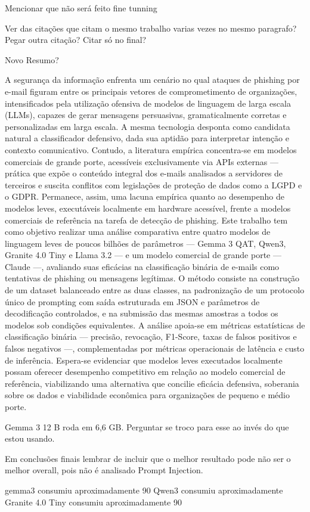 
Mencionar que não será feito fine tunning


Ver das citações que citam o mesmo trabalho varias vezes no mesmo paragrafo?
    Pegar outra citação?
    Citar só no final?


Novo Resumo?

A segurança da informação enfrenta um cenário no qual ataques de phishing por e-mail figuram entre os principais vetores de comprometimento de organizações, intensificados pela utilização ofensiva de modelos de linguagem de larga escala (LLMs), capazes de gerar mensagens persuasivas, gramaticalmente corretas e personalizadas em larga escala. A mesma tecnologia desponta como candidata natural a classificador defensivo, dada sua aptidão para interpretar intenção e contexto comunicativo. Contudo, a literatura empírica concentra-se em modelos comerciais de grande porte, acessíveis exclusivamente via APIs externas — prática que expõe o conteúdo integral dos e-mails analisados a servidores de terceiros e suscita conflitos com legislações de proteção de dados como a LGPD e o GDPR. Permanece, assim, uma lacuna empírica quanto ao desempenho de modelos leves, executáveis localmente em hardware acessível, frente a modelos comerciais de referência na tarefa de detecção de phishing. Este trabalho tem como objetivo realizar uma análise comparativa entre quatro modelos de linguagem leves de poucos bilhões de parâmetros — Gemma 3 QAT, Qwen3, Granite 4.0 Tiny e Llama 3.2 — e um modelo comercial de grande porte — Claude —, avaliando suas eficácias na classificação binária de e-mails como tentativas de phishing ou mensagens legítimas. O método consiste na construção de um dataset balanceado entre as duas classes, na padronização de um protocolo único de prompting com saída estruturada em JSON e parâmetros de decodificação controlados, e na submissão das mesmas amostras a todos os modelos sob condições equivalentes. A análise apoia-se em métricas estatísticas de classificação binária — precisão, revocação, F1-Score, taxas de falsos positivos e falsos negativos —, complementadas por métricas operacionais de latência e custo de inferência. Espera-se evidenciar que modelos leves executados localmente possam oferecer desempenho competitivo em relação ao modelo comercial de referência, viabilizando uma alternativa que concilie eficácia defensiva, soberania sobre os dados e viabilidade econômica para organizações de pequeno e médio porte.

Gemma 3 12 B roda em 6,6 GB. Perguntar se troco para esse ao invés do que estou usando. 

Em conclusões finais lembrar de incluir que o melhor resultado pode não ser o melhor overall, pois não é analisado Prompt Injection.


gemma3 consumiu aproximadamente 90%
Qwen3 consumiu aproximadamente
Granite 4.0 Tiny consumiu aproximadamente 90%
